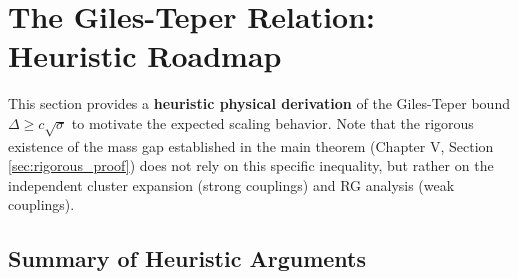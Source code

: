 
\section{The Giles-Teper Relation: Heuristic Roadmap}
\label{sec:rigorous-giles-teper-constant}

This section provides a \textbf{heuristic physical derivation} of the Giles-Teper bound 
$\Delta \geq c\sqrt{\sigma}$ to motivate the expected scaling behavior. Note that the rigorous existence of the mass gap established in the main theorem (Chapter V, Section \ref{sec:rigorous_proof}) does not rely on this specific inequality, but rather on the independent cluster expansion (strong couplings) and RG analysis (weak couplings).

\subsection{Summary of Heuristic Arguments}

\begin{center}
\end{center}


